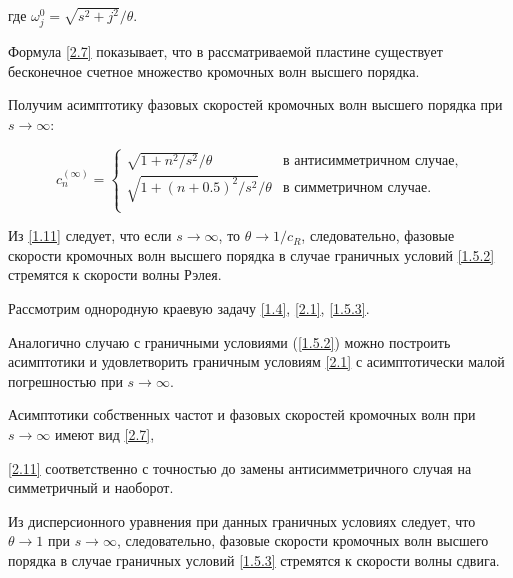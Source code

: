 где $\omega_j^0 =  \sqrt{s^2 + j^2} /{\theta}$. 

Формула \eqref{2.7} показывает, что в рассматриваемой пластине существует бесконечное счетное множество кромочных волн высшего порядка. 

Получим асимптотику фазовых скоростей кромочных волн высшего порядка при $ s \to \infty $:

\begin{equation} 

\label{2.11}

  c_n^{(\infty)}=

  \begin{cases}

   \sqrt{1+{n^2}/{s^2}} /{\theta}             &\text{в антисимметричном случае} ,\\

\sqrt{1+{(n+0.5)^2}/{s^2}} / {\theta} &\text{в симметричном случае}.\\

  \end{cases}

\end{equation}



Из \eqref{1.11} следует, что если $ s \to \infty $, то $\theta \to {1}/{c_R}$, следовательно,  фазовые скорости кромочных волн высшего порядка в случае граничных условий \eqref{1.5.2} стремятся к скорости волны Рэлея.



Рассмотрим однородную краевую задачу \eqref{1.4}, \eqref{2.1}, \eqref{1.5.3}. 

Аналогично случаю с граничными условиями (\ref{1.5.2}) можно построить асимптотики и удовлетворить граничным условиям \eqref{2.1} с асимптотически малой погрешностью при $s\to \infty$. 

Асимптотики собственных частот и фазовых скоростей кромочных волн при $s \to \infty$ имеют вид \eqref{2.7},

\eqref{2.11} соответственно с точностью до замены антисимметричного случая на симметричный и наоборот.



Из дисперсионного уравнения при данных граничных условиях следует, что $\theta \to 1$ при $ s \to \infty $, следовательно,  фазовые скорости кромочных волн высшего порядка в случае граничных условий \eqref{1.5.3} стремятся к скорости волны сдвига.



\smallskip



